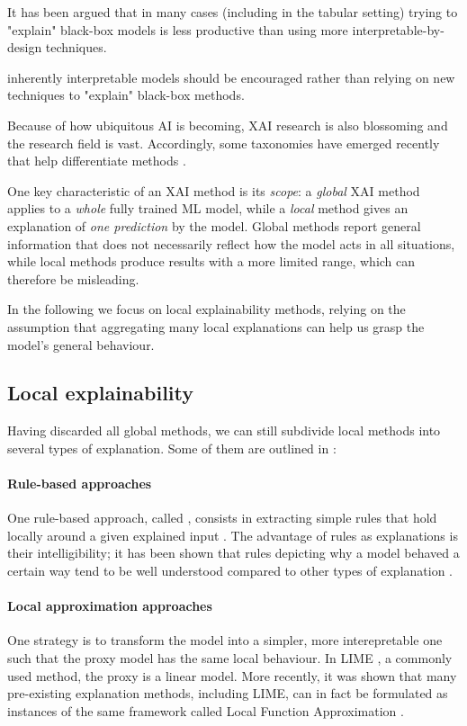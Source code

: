 \documentclass[../main.tex]{subfiles}
\begin{document}
It has been argued \cite{rudinWhy2019} that in many cases (including in the tabular setting) trying to "explain" black-box models is less productive than using more interpretable-by-design techniques.

inherently interpretable models should be encouraged rather than relying on new techniques to "explain" black-box methods.

Because of how ubiquitous AI is becoming, XAI research is also blossoming and the research field is vast.
Accordingly, some taxonomies have emerged recently that help differentiate methods \cite{zhangSurvey2021, bellePrinciples2021}.

One key characteristic of an XAI method is its \emph{scope}: a \emph{global} XAI method applies to a \emph{whole} fully trained ML model, while a \emph{local} method gives an explanation of \emph{one prediction} by the model.
Global methods report general information that does not necessarily reflect
how the model acts in all situations, while local methods produce results with
a more limited range, which can therefore be misleading.


In the following we focus on local explainability methods, relying on the assumption that aggregating many local explanations can help us grasp the model's general behaviour.

\subsection{Local explainability}
Having discarded all global methods, we can still subdivide local methods into several types of explanation. Some of them are outlined in \cite{bellePrinciples2021}:

\paragraph{Rule-based approaches}
One rule-based approach, called , consists in extracting simple rules that hold locally around a given explained input \cite{ribeiroAnchors2018}.
The advantage of rules as explanations is their intelligibility; it has been shown that rules depicting why a model behaved a certain way tend to be well understood compared to other types of explanation \cite{limWhy2009}.

\paragraph{Local approximation approaches}
One strategy is to transform the model into a simpler, more interepretable one such that the proxy model has the same local behaviour. In LIME \cite{ribeiroWhy2016}, a commonly used method, the proxy is a linear model.
More recently, it was shown that many pre-existing explanation methods, including LIME, can in fact be formulated as instances of the same framework called Local Function Approximation \cite{hanWhich2022}.
\end{document}
